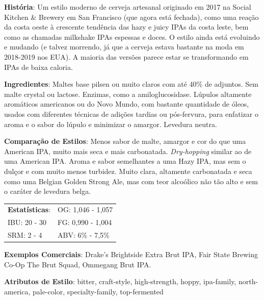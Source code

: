 \textbf{História}: Um estilo moderno de cerveja artesanal originado em 2017 na Social Kitchen \& Brewery em San Francisco (que agora está fechada), como uma reação da costa oeste à crescente tendência das hazy e juicy IPAs da costa leste, bem como as chamadas milkshake IPAs espessas e doces. O estilo ainda está evoluindo e mudando (e talvez morrendo, já que a cerveja estava bastante na moda em 2018-2019 nos EUA). A maioria das versões parece estar se transformando em IPAs de baixa caloria.

\textbf{Ingredientes}: Maltes base pilsen ou muito claros com até 40\% de adjuntos. Sem malte crystal ou lactose. Enzimas, como a amiloglucosidase. Lúpulos altamente aromáticos americanos ou do Novo Mundo, com bastante quantidade de óleos, usados com diferentes técnicas de adições tardias ou pós-fervura, para enfatizar o aroma e o sabor do lúpulo e minimizar o amargor. Levedura neutra.

\textbf{Comparação de Estilos}: Menos sabor de malte, amargor e cor do que uma American IPA, muito mais seca e mais carbonatada. \textit{Dry-hopping} similar ao de uma American IPA. Aroma e sabor semelhantes a uma Hazy IPA, mas sem o dulçor e com muito menos turbidez. Muito clara, altamente carbonatada e seca como uma Belgian Golden Strong Ale, mas com teor alcoólico não tão alto e sem o caráter de levedura belga.

\begin{tabular}{@{}p{35mm}p{35mm}@{}}
  \textbf{Estatísticas}: & OG: 1,046 - 1,057 \\
  IBU: 20 - 30  & FG: 0,990 - 1,004 \\
  SRM: 2 - 4  & ABV: 6\% - 7,5\%
\end{tabular}

\textbf{Exemplos Comerciais}: Drake's Brightside Extra Brut IPA, Fair State Brewing Co-Op The Brut Squad, Ommegang Brut IPA.

\textbf{Atributos de Estilo}: bitter, craft-style, high-strength, hoppy, ipa-family, north-america, pale-color, specialty-family, top-fermented
